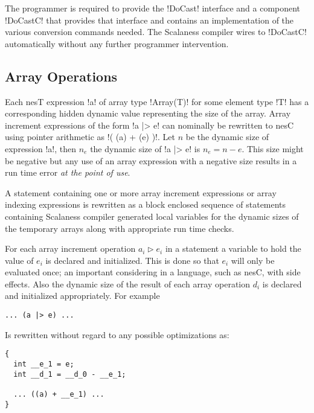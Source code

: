 The programmer is required to provide the !DoCast! interface and a component !DoCastC! that
provides that interface and contains an implementation of the various conversion commands
needed. The Scalaness compiler wires to !DoCastC! automatically without any further programmer
intervention.


\subsection{Array Operations}
\label{section-array-operations}

Each nesT expression !a! of array type !Array(T)! for some element type !T! has a corresponding
hidden dynamic value representing the size of the array. Array increment expressions of the form
!a |> e! can nominally be rewritten to nesC using pointer arithmetic as !( (a) + (e) )!. Let $n$
be the dynamic size of expression !a!, then $n_e$ the dynamic size of !a |> e! is $n_e = n - e$.
This size might be negative but any use of an array expression with a negative size results in a
run time error \emph{at the point of use}.

A statement containing one or more array increment expressions or array indexing expressions is
rewritten as a block enclosed sequence of statements containing Scalaness compiler generated
local variables for the dynamic sizes of the temporary arrays along with appropriate run time
checks.

For each array increment operation $a_i \rhd e_i$ in a statement a variable to hold the value of
$e_i$ is declared and initialized. This is done so that $e_i$ will only be evaluated once; an
important considering in a language, such as nesC, with side effects. Also the dynamic size of
the result of each array operation $d_i$ is declared and initialized appropriately. For example

\singlespace
\begin{lstlisting}[language=nesC]
... (a |> e) ...
\end{lstlisting}
\primaryspacing

Is rewritten without regard to any possible optimizations as:

\singlespace
\begin{lstlisting}[language=nesC]
{
  int __e_1 = e;
  int __d_1 = __d_0 - __e_1;

  ... ((a) + __e_1) ...
}
\end{lstlisting}
\primaryspacing

